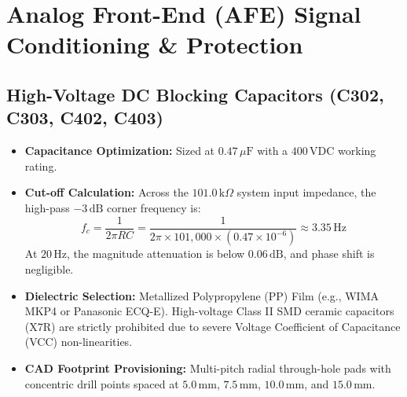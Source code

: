 \documentclass[11pt, letterpaper]{article}
\begin{document}
\section{Analog Front-End (AFE) Signal Conditioning \& Protection}

\subsection{High-Voltage DC Blocking Capacitors (C302, C303, C402, C403)}
\begin{itemize}[leftmargin=1.5em]
    \item \textbf{Capacitance Optimization:} Sized at $0.47\,\mu\text{F}$ with a $400\,\text{VDC}$ working rating.
    \item \textbf{Cut-off Calculation:} Across the $101.0\,\text{k}\Omega$ system input impedance, the high-pass $-3\,\text{dB}$ corner frequency is:
    \begin{equation}
        f_c = \frac{1}{2 \pi R C} = \frac{1}{2 \pi \times 101{,}000 \times (0.47 \times 10^{-6})} \approx 3.35\,\text{Hz}
    \end{equation}
    At $20\,\text{Hz}$, the magnitude attenuation is below $0.06\,\text{dB}$, and phase shift is negligible.
    \item \textbf{Dielectric Selection:} Metallized Polypropylene (PP) Film (e.g., WIMA MKP4 or Panasonic ECQ-E). High-voltage Class II SMD ceramic capacitors (X7R) are strictly prohibited due to severe Voltage Coefficient of Capacitance (VCC) non-linearities.
    \item \textbf{CAD Footprint Provisioning:} Multi-pitch radial through-hole pads with concentric drill points spaced at $5.0\,\text{mm}$, $7.5\,\text{mm}$, $10.0\,\text{mm}$, and $15.0\,\text{mm}$.
\end{itemize}
\end{document}

